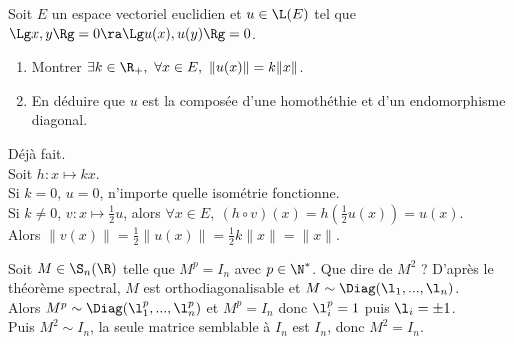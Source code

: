 \documentclass[11pt]{article}
\begin{document}
\begin{exercice}{}{}
    Soit $E$ un espace vectoriel euclidien et $u\in\L(E)$ tel que $\Lg x,y \Rg = 0 \ra \Lg u(x), u(y)\Rg = 0$.
    \begin{enumerate}
        \item Montrer $\exists k \in \R_+, ~ \forall x \in E, ~ \|u(x)\|=k\|x\|$.
        \item En déduire que $u$ est la composée d'une homothéthie et d'un endomorphisme diagonal.
    \end{enumerate}
    \tcblower
     Déjà fait.\\
     Soit $h:x\mapsto kx$.\\
    Si $k=0$, $u=0$, n'importe quelle isométrie fonctionne.\\
    Si $k\neq0$, $v:x\mapsto \frac{1}{2}u$, alors $\forall x \in E, ~ (h\circ v)(x) = h(\frac{1}{2}u(x))=u(x)$.\\
    Alors $\|v(x)\|=\frac{1}{2}\|u(x)\|=\frac{1}{2}k\|x\|=\|x\|$.
\end{exercice}

\begin{exercice}{}{}
    Soit $M\in\S_n(\R)$ telle que $M^p = I_n$ avec $p\in\N^*$. Que dire de $M^2$ ?
    \tcblower
    D'après le théorème spectral, $M$ est orthodiagonalisable et $M\sim\Diag(\l_1,...,\l_n)$.\\
    Alors $M^p \sim \Diag(\l_1^p,...,\l_n^p)$ et $M^p = I_n$ donc $\l_i^p = 1$ puis $\l_i = \pm 1$.\\
    Puis $M^2 \sim I_n$, la seule matrice semblable à $I_n$ est $I_n$, donc $M^2=I_n$.
\end{exercice}

\pagebreak
\end{document}
